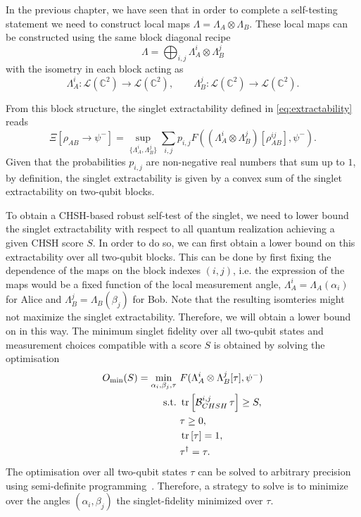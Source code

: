 In the previous chapter, we have seen that in order to complete a self-testing statement we need to construct local maps $\Lambda = \Lambda_A \otimes \Lambda_B$.
These local maps can be constructed using the same block diagonal recipe 
\begin{equation}
		\Lambda = \bigoplus_{i,j} \Lambda_A^i \otimes \Lambda_B^j
\end{equation}
with the isometry in each block acting as
\begin{equation}
	\Lambda_A^i: \mathcal{L}(\mathds{C}^2) \rightarrow \mathcal{L}(\mathds{C}^2), \qquad \Lambda_B^j: \mathcal{L}(\mathds{C}^2) \rightarrow \mathcal{L}(\mathds{C}^2).
\end{equation}

From this block structure, the singlet extractability defined in \eqref{eq:extractability} reads
\begin{equation}
	\Xi [\rho_{AB} \rightarrow \psi^{-}] = \sup_{\{\Lambda_A^i,\Lambda_B^j\}} \sum_{i,j} p_{i,j} F((\Lambda_A^i \otimes \Lambda_B^j)[\rho_{AB}^{ij}],\psi^{-}).
	\label{eq:block_extractability}
\end{equation}
Given that the probabilities $p_{i,j}$ are non-negative real numbers that sum up to $1$, by definition, the singlet extractability is given by a convex sum of the singlet extractability on two-qubit blocks.

\medbreak

To obtain a CHSH-based robust self-test of the singlet, we need to lower bound the singlet extractability with respect to all quantum realization achieving a given CHSH score $S$.
In order to do so, we can first obtain a lower bound on this extractability over all two-qubit blocks.
This can be done by first fixing the dependence of the maps on the block indexes $(i,j)$, i.e. the expression of the maps would be a fixed function of the local measurement angle, $\Lambda_A^i = \Lambda_A(\alpha_i)$ for Alice and $\Lambda_B^j = \Lambda_B(\beta_j)$  for Bob.
Note that the resulting isomteries might not maximize the singlet extractability.
Therefore, we will obtain a lower bound on  in this way.
The minimum singlet fidelity over all two-qubit states and measurement choices compatible with a score $S$ is obtained by solving the optimisation
\begin{equation}
	\begin{split}
		O_{\min}(S)=\min_{\alpha_i, \beta_j, \tau} \-\ & F(\Lambda_A^i \otimes\Lambda_B^j [\tau] ,\psi^-)\\
		\text{s.t.} \-\ &\trr{\mathcal{B}_{CHSH}^{i,j}\, \tau} \geq S,\\
		& \tau \geq 0,\\
		& \trr{\tau} =1,\\
		& \tau^\dag = \tau.
	\end{split}
	\label{eq:sdp_extractability}
\end{equation}
The optimisation over all two-qubit states $\tau$ can be solved to arbitrary precision using semi-definite programming~\cite{Skrzypczyk2023}. 
Therefore, a strategy to solve  is to minimize over the angles $(\alpha_i,\beta_j)$ the singlet-fidelity minimized over $\tau$.

